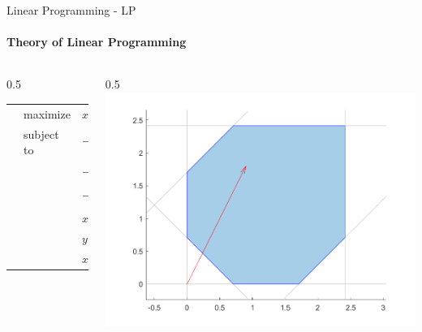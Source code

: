 \documentclass{beamer}
\begin{document}
	\begin{frame}{Linear Programming - LP}
		\framesubtitle{Theory of Linear Programming}
		\begin{columns}[T]
			\begin{column}{0.5\textwidth}
				\small
				\begin{tabularx}{\textwidth}{X l l X}
					& maximize		& $x + 2y$		& \\
					& subject to	& $-x-y+\frac{1}{\sqrt{2}}\leq 0$	& \\
					& 				& $-x+y-\frac{\sqrt{2}+1}{\sqrt{2}}\leq 0$ & \\
					& 				& $-x+y+\frac{\sqrt{2}+1}{\sqrt{2}}\leq 0$ & \\
					& 				& $x-1-\sqrt{2}\leq 0$ & \\
					& 				& $y-1-\sqrt{2}\leq 0$ & \\
					&				& $x, y\geq 0$ &
				\end{tabularx}
			\end{column}
			\begin{column}{0.5\textwidth}
				\includegraphics[width=\textwidth]{images/slides_ex1_2d.png}
			\end{column}
		\end{columns}
	\end{frame}	
\end{document}
